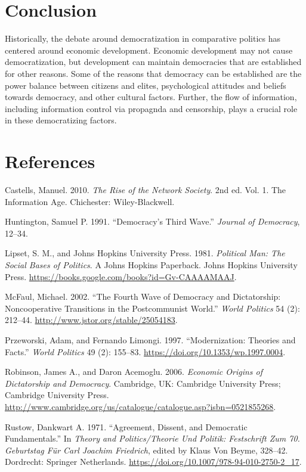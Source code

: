 \documentclass[12pt,]{article}
\begin{document}
\hypertarget{conclusion}{%
\section{Conclusion}\label{conclusion}}

Historically, the debate around democratization in comparative politics
has centered around economic development. Economic development may not
cause democratization, but development can maintain democracies that are
established for other reasons. Some of the reasons that democracy can be
established are the power balance between citizens and elites,
psychological attitudes and beliefs towards democracy, and other
cultural factors. Further, the flow of information, including
information control via propagnda and censorship, plays a crucial role
in these democratizing factors.

\hypertarget{references}{%
\section*{References}\label{references}}

\hypertarget{refs}{}
\leavevmode\hypertarget{ref-castells}{}%
Castells, Manuel. 2010. \emph{The Rise of the Network Society}. 2nd ed.
Vol. 1. The Information Age. Chichester: Wiley-Blackwell.

\leavevmode\hypertarget{ref-huntington}{}%
Huntington, Samuel P. 1991. ``Democracy's Third Wave.'' \emph{Journal of
Democracy}, 12--34.

\leavevmode\hypertarget{ref-lipset}{}%
Lipset, S. M., and Johns Hopkins University Press. 1981. \emph{Political
Man: The Social Bases of Politics}. A Johns Hopkins Paperback. Johns
Hopkins University Press.
\url{https://books.google.com/books?id=Gv-CAAAAMAAJ}.

\leavevmode\hypertarget{ref-mcfaul}{}%
McFaul, Michael. 2002. ``The Fourth Wave of Democracy and Dictatorship:
Noncooperative Transitions in the Postcommunist World.'' \emph{World
Politics} 54 (2): 212--44. \url{http://www.jstor.org/stable/25054183}.

\leavevmode\hypertarget{ref-przeworski}{}%
Przeworski, Adam, and Fernando Limongi. 1997. ``Modernization: Theories
and Facts.'' \emph{World Politics} 49 (2): 155--83.
\url{https://doi.org/10.1353/wp.1997.0004}.

\leavevmode\hypertarget{ref-robinson}{}%
Robinson, James A., and Daron Acemoglu. 2006. \emph{Economic Origins of
Dictatorship and Democracy}. Cambridge, UK: Cambridge University Press;
Cambridge University Press.
\url{http://www.cambridge.org/us/catalogue/catalogue.asp?isbn=0521855268}.

\leavevmode\hypertarget{ref-rustow}{}%
Rustow, Dankwart A. 1971. ``Agreement, Dissent, and Democratic
Fundamentals.'' In \emph{Theory and Politics/Theorie Und Politik:
Festschrift Zum 70. Geburtstag Für Carl Joachim Friedrich}, edited by
Klaus Von Beyme, 328--42. Dordrecht: Springer Netherlands.
\url{https://doi.org/10.1007/978-94-010-2750-2_17}.





\newpage
\singlespacing 
\end{document}
